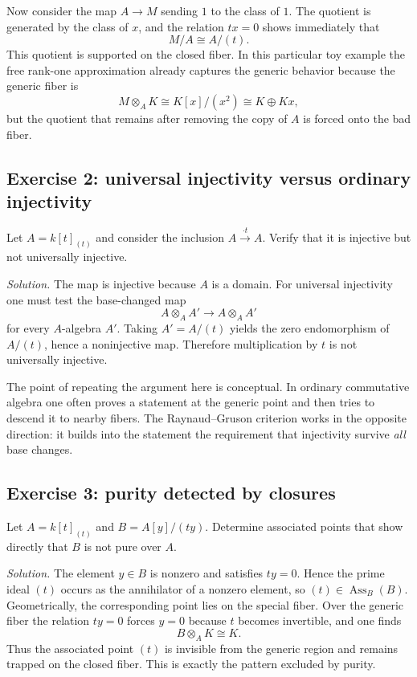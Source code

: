 \documentclass[11pt,oneside]{article}
\newcommand{\Ass}{\operatorname{Ass}}
\newcommand{\ot}{\otimes}
\begin{document}
Now consider the map $A\to M$ sending $1$ to the class of $1$.  The quotient is generated by the class of $x$, and the relation $tx=0$ shows immediately that
\[
M/A\cong A/(t).
\]
This quotient is supported on the closed fiber.  In this particular toy example the free rank-one approximation already captures the generic behavior because the generic fiber is
\[
M\ot_A K\cong K[x]/(x^2)\cong K\oplus Kx,
\]
but the quotient that remains after removing the copy of $A$ is forced onto the bad fiber.

\subsection*{Exercise 2: universal injectivity versus ordinary injectivity}

Let $A=k[t]_{(t)}$ and consider the inclusion $A\xrightarrow{\cdot t}A$.  Verify that it is injective but not universally injective.

\emph{Solution.}  The map is injective because $A$ is a domain.  For universal injectivity one must test the base-changed map
\[
A\ot_A A'\longrightarrow A\ot_A A'
\]
for every $A$-algebra $A'$.  Taking $A'=A/(t)$ yields the zero endomorphism of $A/(t)$, hence a noninjective map.  Therefore multiplication by $t$ is not universally injective.

The point of repeating the argument here is conceptual.  In ordinary commutative algebra one often proves a statement at the generic point and then tries to descend it to nearby fibers.  The Raynaud--Gruson criterion works in the opposite direction: it builds into the statement the requirement that injectivity survive \emph{all} base changes.

\subsection*{Exercise 3: purity detected by closures}

Let $A=k[t]_{(t)}$ and $B=A[y]/(ty)$.  Determine associated points that show directly that $B$ is not pure over $A$.

\emph{Solution.}  The element $y\in B$ is nonzero and satisfies $ty=0$.  Hence the prime ideal $(t)$ occurs as the annihilator of a nonzero element, so $(t)\in \Ass_B(B)$.  Geometrically, the corresponding point lies on the special fiber.  Over the generic fiber the relation $ty=0$ forces $y=0$ because $t$ becomes invertible, and one finds
\[
B\ot_A K\cong K.
\]
Thus the associated point $(t)$ is invisible from the generic region and remains trapped on the closed fiber.  This is exactly the pattern excluded by purity.
\end{document}
